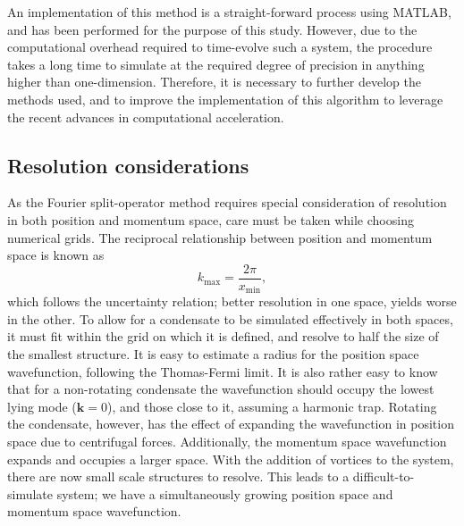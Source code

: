 An implementation of this method is a straight-forward process using MATLAB, and has been performed for the purpose of this study. However, due to the computational overhead required to time-evolve such a system, the procedure takes a long time to simulate at the required degree of precision in anything higher than one-dimension. Therefore, it is necessary to further develop the methods used, and to improve the implementation of this algorithm to leverage the recent advances in computational acceleration.

\subsection{Resolution considerations}
As the Fourier split-operator method requires special consideration of resolution in both position and momentum space, care must be taken while choosing numerical grids. The reciprocal relationship between position and momentum space is known as \begin{equation}
    k_{\text{max}} = \frac{2\pi}{x_{\text{min}}},
\end{equation}
which follows the uncertainty relation; better resolution in one space, yields worse in the other. To allow for a condensate to be simulated effectively in both spaces, it must fit within the grid on which it is defined, and resolve to half the size of the smallest structure. It is easy to estimate a radius for the position space wavefunction, following the Thomas-Fermi limit. It is also rather easy to know that for a non-rotating condensate the wavefunction should occupy the lowest lying mode ($\mathbf{k}=0$), and those close to it, assuming a harmonic trap. Rotating the condensate, however, has the effect of expanding the wavefunction in position space due to centrifugal forces. Additionally, the momentum space wavefunction expands and occupies a larger space. With the addition of vortices to the system, there are now small scale structures to resolve. This leads to a difficult-to-simulate system; we have a simultaneously growing position space and momentum space wavefunction.

